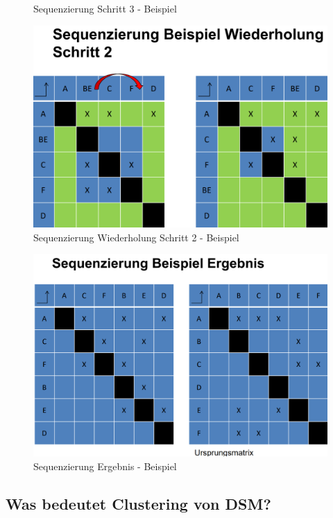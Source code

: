\begin{itemize}
\begin{figure}[H]
            \caption{Sequenzierung Schritt 3 - Beispiel}
        \end{figure}
        \begin{figure}[H]
            \centering
            \includegraphics[width=0.8\linewidth]{Bilder/Teil3_SequenzierungBeispiel3.png}
            \caption{Sequenzierung Wiederholung Schritt 2 - Beispiel}
        \end{figure}
        \begin{figure}[H]
            \centering
            \includegraphics[width=0.8\linewidth]{Bilder/Teil3_SequenzierungBeispiel4.png}
            \caption{Sequenzierung Ergebnis - Beispiel}
        \end{figure}

        
\end{itemize}

\subsection{Was bedeutet Clustering von DSM?}


